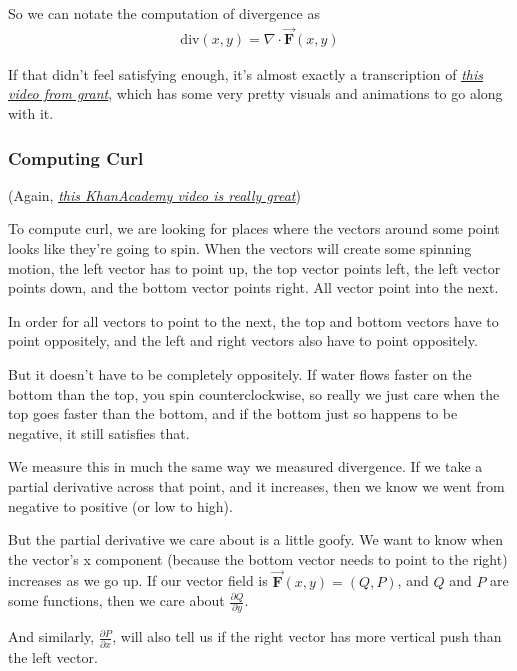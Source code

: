 \documentclass[12pt, letterpaper]{article}
\newcommand{\externalLink}[2]{\emph{\underline{\href{#1}{#2}}}}
\begin{document}
So we can notate the computation of divergence as
\begin{gather*}
    \text{div}(x, y) = \nabla \cdot \vec{\mathbf{F}}(x, y)
\end{gather*}

If that didn't feel satisfying enough, it's almost exactly a transcription of \externalLink{https://www.khanacademy.org/math/multivariable-calculus/multivariable-derivatives/divergence-grant-videos/v/divergence-formula-part-2}{this video from grant},
which has some very pretty visuals and animations to go along with it.

\subsubsection{Computing Curl}
(Again, \externalLink{https://www.khanacademy.org/math/multivariable-calculus/multivariable-derivatives/curl-grant-videos/v/2d-curl-formula}{this KhanAcademy video is really great})

To compute curl, we are looking for places where the vectors around some point looks like they're going to spin.
When the vectors will create some spinning motion, the left vector has to point up, the top vector points left, the left vector points down, and the bottom vector points right.
All vector point into the next.

In order for all vectors to point to the next, the top and bottom vectors have to point oppositely,
and the left and right vectors also have to point oppositely.

But it doesn't have to be completely oppositely.
If water flows faster on the bottom than the top, you spin counterclockwise, so really we just care when the top goes faster than the bottom, and if the bottom just so happens to be negative, it still satisfies that.

We measure this in much the same way we measured divergence.
If we take a partial derivative across that point, and it increases, then we know we went from negative to positive (or low to high).

But the partial derivative we care about is a little goofy.
We want to know when the vector's x component (because the bottom vector needs to point to the right) increases as we go up.
If our vector field is $\vec{\mathbf{F}}(x, y) = (Q, P)$, and $Q$ and $P$ are some functions, then we care about $\frac{\partial Q}{\partial y}$. 

And similarly, $\frac{\partial P}{\partial x}$, will also tell us if the right vector has more vertical push than the left vector.
\end{document}
